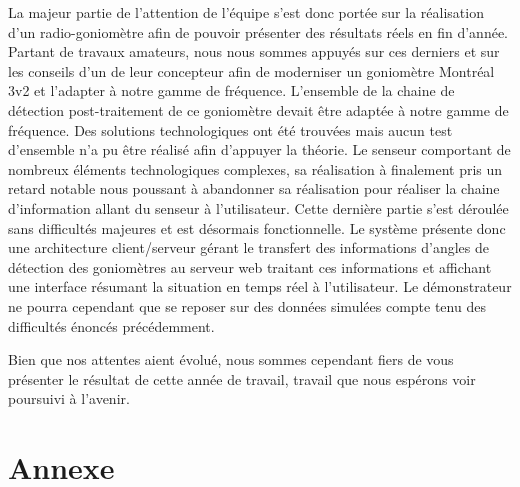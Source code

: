 \documentclass[a4paper, 11pt, oneside, oldfontcommands]{memoir}
\newcounter{th}[chapter]
\begin{document}
La majeur partie de l'attention de l'équipe s'est donc portée sur la réalisation d'un radio-goniomètre afin de pouvoir présenter des résultats réels en fin d'année. Partant de travaux amateurs, nous nous sommes appuyés sur ces derniers et sur les conseils d'un de leur concepteur afin de moderniser un goniomètre Montréal 3v2 et l'adapter à notre gamme de fréquence. L'ensemble de la chaine de détection post-traitement de ce goniomètre devait être adaptée à notre gamme de fréquence. Des solutions technologiques ont été trouvées mais aucun test d'ensemble n'a pu être réalisé afin d'appuyer la théorie. Le senseur comportant de nombreux éléments technologiques complexes, sa réalisation à finalement pris un retard notable nous poussant à abandonner sa réalisation pour réaliser la chaine d'information allant du senseur à l'utilisateur. Cette dernière partie s'est déroulée sans difficultés majeures et est désormais fonctionnelle. Le système présente donc une architecture client/serveur gérant le transfert des informations d'angles de détection des goniomètres au serveur web traitant ces informations et affichant une interface résumant la situation en temps réel à l'utilisateur. Le démonstrateur ne pourra cependant que se reposer sur des données simulées compte tenu des difficultés énoncés précédemment.

Bien que nos attentes aient évolué, nous sommes cependant fiers de vous présenter le résultat de cette année de travail, travail que nous espérons voir poursuivi à l'avenir.

\newpage




\part*{Annexe}
\appendix
\nocite{*}
%
%
%









\newpage
 \listoffigures
 \printindex
 
  
\end{document}

